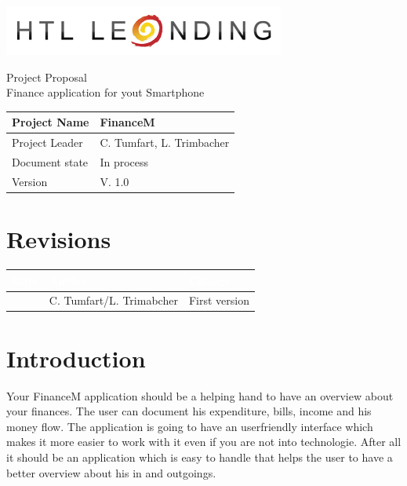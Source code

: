 \documentclass[12pt]{article}
\theoremstyle{definition}
\newcommand{\projectname}{FinanceM}
\newcommand{\productname}{Finance application for yout Smartphone}
\newcommand{\projectleader}{C. Tumfart, L. Trimbacher}
\newcommand{\documentstatus}{In process}
\newcommand{\version}{V. 1.0}
\begin{document}
\begin{titlepage}
\begin{flushright}
\includegraphics[scale=.5]{htlleondinglogo.png}\\
\end{flushright}

\vspace{10em}

\begin{center}
{\Huge Project Proposal} \\[3em]
{\LARGE \productname} \\[3em]
\end{center}

\begin{flushleft}
\begin{tabular}{|l|l|}
\hline
Project Name & \projectname \\ \hline
Project Leader & \projectleader \\ \hline
Document state & \documentstatus \\ \hline
Version & \version \\ \hline
\end{tabular}
\end{flushleft}

\end{titlepage}
\section*{Revisions}
\begin{tabular}{|l|l|l|}
\hline
\cellcolor[gray]{0.5}\textcolor{white}{Date} & \cellcolor[gray]{0.5}\textcolor{white}{Author} & \cellcolor[gray]{0.5}\textcolor{white}{Change} \\ \hline
&C. Tumfart/L. Trimabcher&First version \\ \hline
\end{tabular}
\pagebreak

\tableofcontents
\pagebreak

\section{Introduction}
Your FinanceM application should be a helping hand to have an overview about your finances. The user can document his expenditure, bills, income and his money flow. 
The application is going to have an userfriendly interface which makes it more easier to work with it even if you are not into technologie.
After all it should be an application which is easy to handle that helps the user to have a better overview about his in and outgoings.
\pagebreak
\end{document}
